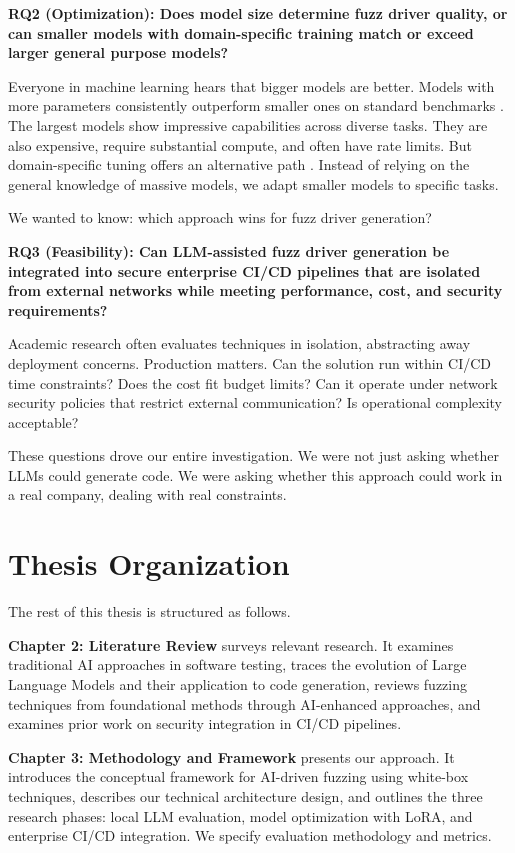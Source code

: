 \textbf{RQ2 (Optimization): Does model size determine fuzz driver quality, or can smaller models with domain-specific training match or exceed larger general purpose models?}

Everyone in machine learning hears that bigger models are better. Models with more parameters consistently outperform smaller ones on standard benchmarks \cite{Jiang2023}. The largest models show impressive capabilities across diverse tasks. They are also expensive, require substantial compute, and often have rate limits. But domain-specific tuning offers an alternative path \cite{Hu2021}. Instead of relying on the general knowledge of massive models, we adapt smaller models to specific tasks.

We wanted to know: which approach wins for fuzz driver generation?

\textbf{RQ3 (Feasibility): Can LLM-assisted fuzz driver generation be integrated into secure enterprise CI/CD pipelines that are isolated from external networks while meeting performance, cost, and security requirements?}

Academic research often evaluates techniques in isolation, abstracting away deployment concerns. Production matters. Can the solution run within CI/CD time constraints? Does the cost fit budget limits? Can it operate under network security policies that restrict external communication? Is operational complexity acceptable?

These questions drove our entire investigation. We were not just asking whether LLMs could generate code. We were asking whether this approach could work in a real company, dealing with real constraints.

\section{Thesis Organization}
\label{sec:thesis_organization}

The rest of this thesis is structured as follows.

\textbf{Chapter 2: Literature Review} surveys relevant research. It examines traditional AI approaches in software testing, traces the evolution of Large Language Models and their application to code generation, reviews fuzzing techniques from foundational methods through AI-enhanced approaches, and examines prior work on security integration in CI/CD pipelines.

\textbf{Chapter 3: Methodology and Framework} presents our approach. It introduces the conceptual framework for AI-driven fuzzing using white-box techniques, describes our technical architecture design, and outlines the three research phases: local LLM evaluation, model optimization with LoRA, and enterprise CI/CD integration. We specify evaluation methodology and metrics.

